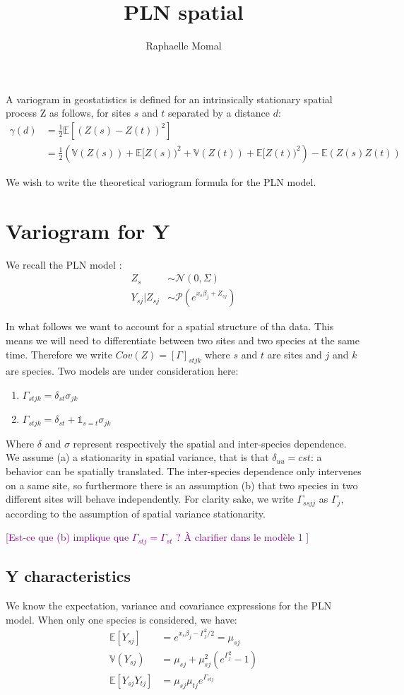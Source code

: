 \documentclass[10pt,a4paper]{article}
\author{Raphaelle Momal}
\title{PLN spatial}
\newcommand{\esp}{\mathds{E}}
\newcommand{\var}{\mathds{V}}
\newcommand{\RM}[1]{\textcolor{purple}{[#1]}}
\begin{document}
\maketitle
A variogram in geostatistics is defined for an intrinsically stationary spatial process Z as follows, for sites $s$ and $t$ separated by a distance $d$:
\begin{align*}
 \gamma (d) &=  \frac{1}{2} \esp[(Z(s) - Z(t) )^2]\\
 &=\frac{1}{2} \left(\var(Z(s)) + \esp[Z(s))^2 + \var(Z(t)) + \esp[Z(t))^2 \right) - \esp(Z(s)Z(t))
\end{align*}

We wish to write the theoretical variogram formula for the PLN model.
\section{Variogram for  Y}
We recall the PLN model :
\begin{align*}
Z_s &\sim \mathcal{N}(0,\Sigma)\\
Y_{sj}|Z_{sj} &\sim \mathcal{P}(e^{x_s \beta_j + Z_{sj}}) 
\end{align*}

In what follows we want to account for a spatial structure of tha data. This means we will need to differentiate between two sites and two species at the same time. Therefore we write $Cov(Z) = [\Gamma]_{stjk}$ where $s$ and $t$ are sites and $j$ and $k$ are species. Two models are under consideration here:
\begin{enumerate}
\item $\Gamma_{stjk} = \delta_{st} \sigma_{jk}$
\item $\Gamma_{stjk} = \delta_{st} + \mathds{1}_{s=t}\sigma_{jk}$
\end{enumerate}
Where $\delta$ and $\sigma$ represent respectively the spatial and inter-species dependence.  We  assume (a) a stationarity in spatial variance, that is that $\delta_{uu} = cst$: a behavior can be spatially translated. The inter-species dependence only  intervenes  on a same site, so furthermore there is an assumption (b) that two species in two different sites will behave independently.  For clarity sake, we write $\Gamma_{ssjj}$ as $\Gamma_{j}$, according to the assumption of spatial variance stationarity. 

\RM{Est-ce que (b) implique que $\Gamma_{stj} = \Gamma_{st}$ ? À clarifier dans le modèle 1 }
\subsection{Y characteristics}
We know the expectation, variance and covariance expressions for the PLN model. When only one species is considered, we have:
\begin{align*}
\esp[Y_{sj}] &= e^{x_s\beta _j- \Gamma_{j}^2/2} = \mu_{sj}\\
\var(Y_{sj}) &= \mu_{sj}+\mu_{sj}^2(e^{\Gamma_{j}^2} - 1)\\
\esp[Y_{sj}Y_{tj}]&= \mu_{sj}\mu_{tj} e^{\Gamma_{stj}}
\end{align*}
\end{document}

